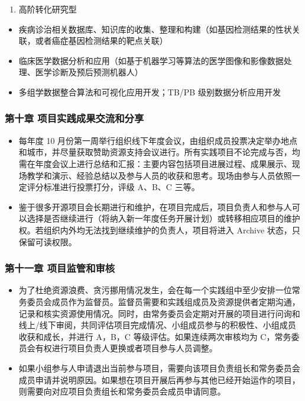 \documentclass[]{article}
\providecommand{\tightlist}{%
  \setlength{\itemsep}{0pt}\setlength{\parskip}{0pt}}
\begin{document}
\begin{enumerate}
\def\labelenumi{\arabic{enumi}.}
\setcounter{enumi}{2}
\tightlist
\item
  高阶转化研究型
\end{enumerate}

\begin{itemize}
\tightlist
\item
  疾病诊治相关数据库、知识库的收集、整理和构建（如基因检测结果的性状关联，或者癌症基因检测结果的靶点关联）
\item
  临床医学数据分析和应用（如基于机器学习等算法的医学图像和影像数据处理、医学诊断及预后预测机器人）
\item
  多组学数据整合算法和可视化应用开发；TB/PB 级别数据分析应用开发
\end{itemize}

\subsubsection{第十章 项目实践成果交流和分享}\label{-}

\begin{itemize}
\item
  每年度 10
  月份第一周举行组织线下年度会议，由组织成员投票决定举办地点和城市，并尽量获取赞助资源支持会议进行。所有实践项目不论完成与否，均需在年度会议上进行总结和汇报：主要内容包括项目进展过程、成果展示、现场教学和演示、经验总结以及参与人员的收获和思考。现场由参与人员依照一定评分标准进行投票打分，评级
  A、B、C 三等。
\item
  鉴于很多开源项目会长期进行和维护，在项目完成后，项目负责人和参与人可以选择是否继续进行（将纳入新一年度任务开展计划）或转移相应项目的维护权。若组织内外均无法找到继续维护的负责人，项目将进入
  Archive 状态，只保留可读权限。
\end{itemize}

\subsubsection{第十一章 项目监管和审核}\label{-}

\begin{itemize}
\item
  为了杜绝资源浪费、贪污挪用情况发生，会在每一个实践组中至少安排一位常务委员会成员作为监督员。监督员需要和实践组成员及资源提供者定期沟通，记录和核实资源使用情况。同时，由常务委员会定期对开展的项目进行问询和线上/线下审阅，共同评估项目完成情况、小组成员参与的积极性、小组成员收获和成长，并进行
  A，B，C 等级评估。如果连续两次审核均为
  C，常务委员会有权进行项目负责人更换或者项目参与人员调整。
\item
  如果小组参与人申请退出当前参与项目，需要向该项目负责组长和常务委员会成员申请并说明原因。如果想在项目开展后再参与其他已经开始运作的项目，则需要向对应项目负责组长和常务委员会成员申请同意。
\end{itemize}
\end{document}
